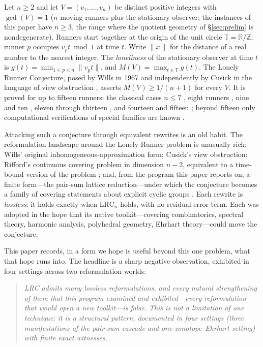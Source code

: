 \documentclass[11pt,a4paper]{article}
\numberwithin{equation}{section}
\theoremstyle{plain}
\theoremstyle{definition}
\theoremstyle{remark}
\newcommand{\Z}{\mathbb{Z}}
\newcommand{\R}{\mathbb{R}}
\newcommand{\T}{\mathbb{T}}
\newcommand{\wnc}[1]{\lVert #1 \rVert}
\newcommand{\lrc}{\mathrm{LRC}}
\begin{document}
Let $n\ge 2$ and let $V=(v_1,\dots,v_n)$ be distinct positive integers
with $\gcd(V)=1$ ($n$ moving runners plus the stationary observer; the
instances of this paper have $n\ge 3$, the range where the quotient
geometry of \S\ref{sec:prelim} is nondegenerate). Runners start together
at the origin of the unit circle
$\T=\R/\Z$; runner $p$ occupies $v_p t \bmod 1$ at time $t$. Write
$\wnc{x}$ for the distance of a real number to the nearest integer. The
\emph{loneliness} of the stationary observer at time $t$ is
$g(t)=\min_{1\le p\le n}\wnc{v_p t}$, and $M(V)=\max_{t\in\T}g(t)$. The
Lonely Runner Conjecture, posed by Wills in 1967 and independently by
Cusick in the language of view obstruction
\cite{PS-survey,Wills,Cusick1973}, asserts $M(V)\ge 1/(n{+}1)$ for every
$V$. It is proved for up to fifteen runners: the classical cases
$n\le7$ \cite{PS-survey}, eight runners \cite{Rosenfeld8}, nine and ten
\cite{Trakulthongchai}, eleven through thirteen \cite{Sungkawichai}, and
fourteen and fifteen \cite{Allikvere}; beyond fifteen only computational
verifications of special families are known
\cite{PS-survey,MSS}.

Attacking such a conjecture through equivalent rewrites is an old habit.
The reformulation landscape around the Lonely Runner problem is unusually
rich: Wills' original inhomogeneous-approximation form; Cusick's view
obstruction; Rifford's continuous covering problem in dimension $n-2$,
equivalent to a time-bound version of the problem \cite{Rifford}; and, from
the program this paper reports on, a finite form---the pair-sum lattice
reduction---under which the conjecture becomes a family of covering
statements about explicit cyclic groups \cite{PS-survey,prog-artifacts}.
Each rewrite is \emph{lossless}: it holds exactly when $\lrc_n$ holds,
with no residual error term. Each was adopted in the hope that its native
toolkit---covering combinatorics, spectral theory, harmonic analysis,
polyhedral geometry, Ehrhart theory---could move the conjecture.

This paper records, in a form we hope is useful beyond this one problem,
what that hope runs into. The headline is a sharp negative observation,
exhibited in four settings across two reformulation worlds:

\begin{quote}
\emph{LRC admits many lossless reformulations, and every natural
strengthening of them that this program examined and exhibited---every
reformulation that would open a new toolkit---is false. This is not a
limitation of one technique; it is a structural pattern, documented in
four settings (three manifestations of the pair-sum cascade and one
zonotope--Ehrhart setting) with finite exact witnesses.}
\end{quote}
\end{document}
